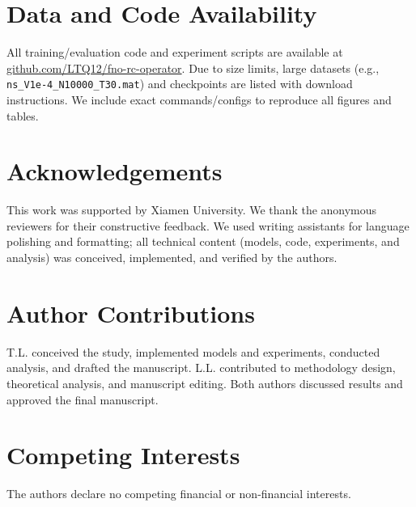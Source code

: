 \documentclass[11pt]{article}
\begin{document}
\section*{Data and Code Availability}
All training/evaluation code and experiment scripts are available at \href{https://github.com/LTQ12/fno-rc-operator}{github.com/LTQ12/fno-rc-operator}. Due to size limits, large datasets (e.g., \texttt{ns\_V1e-4\_N10000\_T30.mat}) and checkpoints are listed with download instructions. We include exact commands/configs to reproduce all figures and tables.

\section*{Acknowledgements}
This work was supported by Xiamen University. We thank the anonymous reviewers for their constructive feedback. We used writing assistants for language polishing and formatting; all technical content (models, code, experiments, and analysis) was conceived, implemented, and verified by the authors.

\section*{Author Contributions}
T.L. conceived the study, implemented models and experiments, conducted analysis, and drafted the manuscript. L.L. contributed to methodology design, theoretical analysis, and manuscript editing. Both authors discussed results and approved the final manuscript.

\section*{Competing Interests}
The authors declare no competing financial or non-financial interests.




\clearpage
\end{document}

